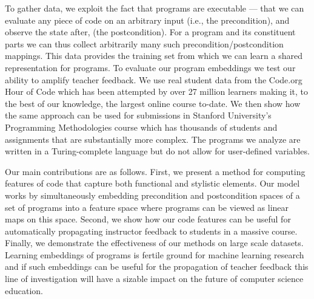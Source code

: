 To gather data, we exploit the fact that programs are 
executable --- that we can evaluate any piece of code on 
an arbitrary input (i.e., the precondition), and observe the state  
after, (the postcondition). For a program and its 
constituent parts we can thus collect arbitrarily many such precondition/postcondition mappings. This %
data provides the training set from which we can learn a shared representation for programs. 
To evaluate our program embeddings we test our ability to amplify teacher feedback. We use real student data from the Code.org Hour of Code which has been attempted by over 27 million learners
making it, to the best of our knowledge,
the largest online course to-date. 
We then show how the same approach can be used for submissions in Stanford University's Programming Methodologies course which has thousands of students and assignments that are substantially more complex. The programs we analyze are written in a Turing-complete language but do not allow for user-defined variables.

Our main contributions are as follows. First, we present a 
method for computing features of code that capture both functional
and stylistic elements.  Our model works by simultaneously embedding precondition and postcondition spaces of 
a set of programs into a feature space where programs can be viewed as linear maps on this space.
Second, we show how our code features can be useful for automatically
propagating instructor feedback to students in a massive course.
Finally, we demonstrate the effectiveness of our methods
on large scale datasets.
Learning embeddings of programs is fertile ground for machine learning research and if such embeddings can be useful for the propagation of teacher feedback this line of investigation will have a sizable impact on the future of computer science education.

